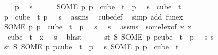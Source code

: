 \begin{isabellebody}
\ \ \ \ {\isasymand}\ p\ {}\ {\isacharequal}{\kern0pt}\ s{\isacharparenright}{\kern0pt}\ {}{\isacharparenright}{\kern0pt}{\isachardoublequoteclose}\isanewline
\ \ \ \ \ {\isachardoublequoteopen}{\isacharparenleft}{\kern0pt}SOME\ p{\isachardot}{\kern0pt}\ p\ {\isasymin}\ cube\ {}\ t\ {\isasymand}\ p\ {}\ {\isacharequal}{\kern0pt}\ s{\isacharparenright}{\kern0pt}\ {\isasymin}\ cube\ {}\ t{\isachardoublequoteclose}\isanewline
%
\isadelimproof
%
\endisadelimproof
%
\isatagproof
{}\isamarkupfalse%
\ {\isacharminus}{\kern0pt}\isanewline
\ \ \isamarkupfalse%
\ {}{\isacharcolon}{\kern0pt}\ {\isachardoublequoteopen}{\isasymexists}p\ {\isasymin}\ cube\ {}\ t{\isachardot}{\kern0pt}\ p\ {}\ {\isacharequal}{\kern0pt}\ s{\isachardoublequoteclose}\ \isamarkupfalse%
\ assms\ \isamarkupfalse%
\ cube{\isacharunderscore}{\kern0pt}def\ \isamarkupfalse%
\ {\isacharparenleft}{\kern0pt}simp\ add{\isacharcolon}{\kern0pt}\ fun{\isacharunderscore}{\kern0pt}ex{\isacharparenright}{\kern0pt}\isanewline
\ \ \isamarkupfalse%
\ {}{\isacharcolon}{\kern0pt}\ {\isachardoublequoteopen}{\isacharparenleft}{\kern0pt}SOME\ p{\isachardot}{\kern0pt}\ p\ {\isasymin}\ cube\ {}\ t\ {\isasymand}\ p\ {}\ {\isacharequal}{\kern0pt}\ s{\isacharparenright}{\kern0pt}\ {}\ {\isacharequal}{\kern0pt}\ s{\isachardoublequoteclose}\ \isamarkupfalse%
\ assms\ {}\ someI{\isacharunderscore}{\kern0pt}ex{\isacharbrackleft}{\kern0pt}of\ {\isachardoublequoteopen}{\isasymlambda}x{\isachardot}{\kern0pt}\ x\isanewline
\ \ {\isasymin}\ cube\ {}\ t\ {\isasymand}\ x\ {}\ {\isacharequal}{\kern0pt}\ s{\isachardoublequoteclose}{\isacharbrackright}{\kern0pt}\ \isamarkupfalse%
\ blast\ \isanewline
\ \ \isamarkupfalse%
\ {}{\isacharcolon}{\kern0pt}\ {\isachardoublequoteopen}{\isacharparenleft}{\kern0pt}{\isasymlambda}s{\isasymin}{\isacharbraceleft}{\kern0pt}{\isachardot}{\kern0pt}{\isachardot}{\kern0pt}{\isacharless}{\kern0pt}t{\isacharbraceright}{\kern0pt}{\isachardot}{\kern0pt}\ S\ {\isacharparenleft}{\kern0pt}SOME\ p{\isachardot}{\kern0pt}\ p{\isasymin}cube\ {}\ t\ {\isasymand}\ p\ {}\ {\isacharequal}{\kern0pt}\ s{\isacharparenright}{\kern0pt}{\isacharparenright}{\kern0pt}\ s\ {\isacharequal}{\kern0pt}\isanewline
\ \ {\isacharparenleft}{\kern0pt}{\isasymlambda}s{\isasymin}{\isacharbraceleft}{\kern0pt}{\isachardot}{\kern0pt}{\isachardot}{\kern0pt}{\isacharless}{\kern0pt}t{\isacharbraceright}{\kern0pt}{\isachardot}{\kern0pt}\ S\ {\isacharparenleft}{\kern0pt}SOME\ p{\isachardot}{\kern0pt}\ p{\isasymin}cube\ {}\ t\ {\isasymand}\ p\ {}\ {\isacharequal}{\kern0pt}\ s{\isacharparenright}{\kern0pt}{\isacharparenright}{\kern0pt}\ {\isacharparenleft}{\kern0pt}{\isacharparenleft}{\kern0pt}SOME\ p{\isachardot}{\kern0pt}\ p\ {\isasymin}\ cube\ {}\ t\isanewline

\end{isabellebody}

